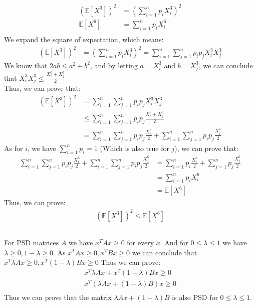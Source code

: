 \documentclass{article}
\begin{document}
\subsection{} %
\begin{align*}
    (\mathbb{E}[X^3])^2 &= (\sum_{i=1}^{n} p_iX_i^3)^2 \\
    \mathbb{E}[X^6] &= \sum_{i=1 }^{n} p_iX_i^6 \\
\end{align*}
We expand the square of expectation, which means:
\begin{align*}
    (\mathbb{E}[X^3])^2 &= (\sum_{i=1}^{n} p_iX_i^3)^2 =\sum_{i=1}^{n} \sum_{j=1 }^{n} p_ip_jX_i^3X_j^3
\end{align*}
We know that $ 2ab \leq a^2 + b^2 $, and by letting $ a = X_i^3 $ and $ b = X_j^3 $, we can conclude that $ X_i^3X_j^3\leq \frac{X_i^6 + X_j^6}{2} $ \\
Thus, we can prove that:
\begin{align*}
    (\mathbb{E}[X^3])^2 &= \sum_{i=1}^{n} \sum_{j=1 }^{n} p_ip_jX_i^3X_j^3 \\
                        &\leq \sum_{i=1}^{n} \sum_{j=1 }^{n} p_ip_j\frac{X_i^6 + X_j^6}{2} \\
                        &= \sum_{i=1}^{n} \sum_{j=1 }^{n} p_ip_j \frac{X_i^6}{2} + \sum_{i=1}^{n} \sum_{j=1 }^{n} p_ip_j \frac{X_j^6 }{2}
\end{align*}
As for $ i $, we have $ \sum_{i=1}^{n} p_i=1 $ (Which is also true for $ j $), we can prove that:
\begin{align*}
    \sum_{i=1}^{n} \sum_{j=1 }^{n} p_ip_j \frac{X_i^6}{2} + \sum_{i=1}^{n} \sum_{j=1 }^{n} p_ip_j \frac{X_j^6 }{2} &= \sum_{i=1}^{n} p_i \frac{X_i^6 }{2} + \sum_{j=1 }^{n} p_j \frac{X_j^6 }{2} \\
&= \sum_{i=1}^{n} p_iX_i^6 \\
&= \mathbb{E}[X^6]
\end{align*}
Thus, we can prove:
\begin{align*}
    (\mathbb{E}[X^3])^2 \leq \mathbb{E}[X^6]
\end{align*}
\subsection{} %
For PSD matrices $ A $ we have $ x^TAx\geq 0 $ for every $ x $. And for $ 0\leq \lambda \leq 1 $ we have $ \lambda \geq 0, 1- \lambda \geq 0 $. 
As $ x^TAx \geq 0, x^TBx \geq 0 $ we can conclude that $ x^T\lambda Ax\geq 0, x^T(1-\lambda)Bx\geq 0 $
Thus we can prove:
\begin{align*}
    x^T\lambda Ax + x^T(1-\lambda)Bx\geq 0 \\
    x^T(\lambda Ax + (1-\lambda)B)x\geq 0 \\
\end{align*}
Thus we can prove that the matrix $ \lambda Ax + (1-\lambda)B $ is also PSD for $ 0 \leq \lambda \leq 1 $.
\clearpage
\end{document}
